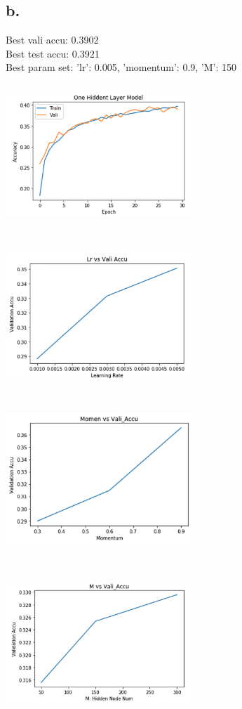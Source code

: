 \documentclass{article}
\begin{document}
\subsection*{b.}
Best vali accu: 0.3902 \\
Best test accu: 0.3921 \\
Best param set: {'lr': 0.005, 'momentum': 0.9, 'M': 150} \\
\includegraphics[width=7cm, height=6cm]{plots/A5b.png} 
\includegraphics[width=7cm, height=6cm]{plots/A5b_1.png} \\
\includegraphics[width=7cm, height=6cm]{plots/A5b_2.png}
\includegraphics[width=7cm, height=6cm]{plots/A5b_3.png} \\
\end{document}
